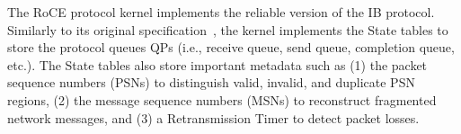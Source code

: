 



%

 The RoCE protocol kernel implements the reliable version of the IB protocol. Similarly to its original specification~\cite{rdma_specification}, the kernel implements the State tables to store the protocol queues QPs (i.e., receive queue, send queue, completion queue, etc.). The State tables also store important metadata such as (1) the packet sequence numbers (PSNs) to distinguish valid, invalid, and duplicate PSN regions, (2) the message sequence numbers (MSNs) to reconstruct fragmented network messages, and (3) a Retransmission Timer to detect packet losses.

